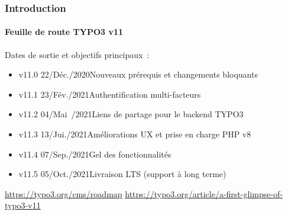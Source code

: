 %

\begin{frame}[fragile]
	\frametitle{Introduction}
	\framesubtitle{Feuille de route TYPO3 v11}

	Dates de sortie et objectifs principaux~:

	\begin{itemize}
		\item v11.0 \tabto{1.1cm}22/Déc./2020\tabto{3.4cm}Nouveaux prérequis et changements bloquants
		\item v11.1 \tabto{1.1cm}23/Fév./2021\tabto{3.4cm}Authentification multi-facteurs
		\item v11.2 \tabto{1.1cm}04/Mai~/2021\tabto{3.4cm}Liens de partage pour le backend TYPO3
		\item
			\begingroup
				\color{typo3orange}
				v11.3 \tabto{1.1cm}13/Jui./2021\tabto{3.4cm}Améliorations UX et prise en charge PHP v8
			\endgroup
		\item v11.4 \tabto{1.1cm}07/Sep./2021\tabto{3.4cm}Gel des fonctionnalités
		\item v11.5 \tabto{1.1cm}05/Oct./2021\tabto{3.4cm}Livraison LTS (support à long terme)
	\end{itemize}

	\smaller
		\url{https://typo3.org/cms/roadmap}\newline
		\url{https://typo3.org/article/a-first-glimpse-of-typo3-v11}
	\normalsize

\end{frame}

